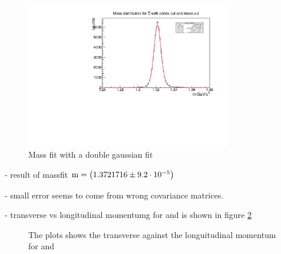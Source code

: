 		\begin{figure}
			\centering
				\includegraphics[width=0.8\textwidth]{./plots/Xi/XiPlus_m_masscut.pdf}
			\caption{Mass fit with a double gaussian fit}
			\label{fig:XiPlus_massfit}
		\end{figure}
		
		- result of massfit $\textnormal{m} = \left( 1.3721716 \pm 9.2\cdot 10^{-5}\right)$ \massunit
		
		- small error seems to come from wrong covariance matrices.
		
		- transverse vs longitudinal momentumg for \anticascade and \cascade is shown in figure \ref{fig:XiPlus_pt_vs_pz} 
		
		\begin{figure}
			\caption{The plots shows the transverse against the longuitudinal momentum for \anticascade and \cascade}
			\label{fig:XiPlus_pt_vs_pz}
		
		\end{figure}
		
